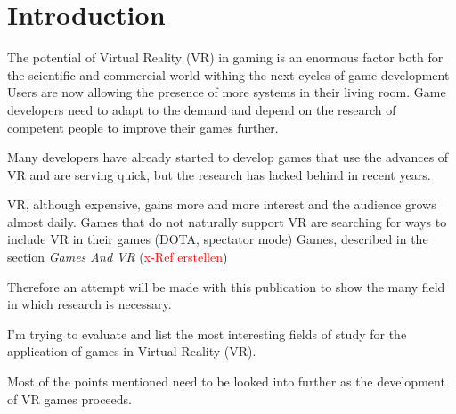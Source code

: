 \section{Introduction}

The potential of Virtual Reality (VR) in gaming is an enormous factor both for the scientific and commercial world withing the next cycles of game development Users are now allowing the presence of more systems in their living room. Game developers need to adapt to the demand and depend on the research of competent people to improve their games further.

Many developers have already started to develop games that use the advances of VR and are serving quick, but the research has lacked behind in recent years. 

VR, although expensive, gains more and more interest and the audience grows almost daily. 
Games that do not naturally support VR are searching for ways to include VR in their games (DOTA, spectator mode)
Games, described in the section \textit{Games And VR} (\textcolor{red}{x-Ref erstellen})

Therefore an attempt will be made with this publication to show the many field in which research is necessary. 

I'm trying to evaluate and list the most interesting fields of study for the application of games in Virtual Reality (VR).

Most of the  points mentioned need to be looked into further as the development of VR games proceeds.




